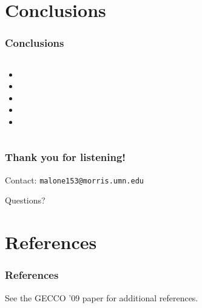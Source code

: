 \documentclass{beamer}
\newcommand{\linespace}{\vskip 0.25cm}
\begin{document}
\section[Conclusions]{Conclusions}

\begin{frame}
  \frametitle{Conclusions}
  
  \begin{columns}
  \begin{column}{0.6\textwidth}
  \begin{itemize}
  	\item 
	\item 
	\item 
	\item 
	\item 
  \end{itemize}
  \end{column}
  \end{columns}
\end{frame}




\begin{frame}
	\frametitle{Thank you for listening!}
	
	
		
	\linespace
	\linespace
	
	Contact:  
		\texttt{malone153@morris.umn.edu}
	
	\linespace
	\linespace
	
	\begin{center}
	{\huge Questions?}
	\end{center}
\end{frame}

\section*{References}

\begin{frame} 
	\frametitle{References} 
	
	
	
	\linespace
	\begin{center}
	See the GECCO '09 paper for additional references.
	\end{center}
\end{frame} 
\end{document}
